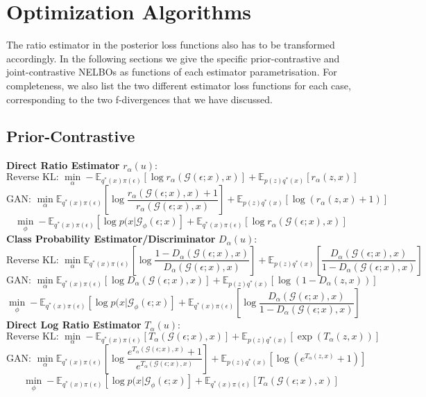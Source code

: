 \documentclass[honours,12pt]{unswthesis}
\newcommand{\E}{\mathbb{E}}
\numberwithin{equation}{section}
\theoremstyle{definition}
\begin{document}
\section{Optimization Algorithms}
The ratio estimator in the posterior loss functions also has to be transformed accordingly. In the following sections we give the specific prior-contrastive and joint-contrastive NELBOs as functions of each estimator parametrisation. For completeness, we also list the two different estimator loss functions for each case, corresponding to the two f-divergences that we have discussed.
\subsection{Prior-Contrastive}
\textbf{Direct Ratio Estimator} $r_\alpha(u)$:
\[\text{Reverse KL: }\min_\alpha -\E_{q^*(x)\pi(\epsilon)}[\log r_\alpha(\mathcal{G}(\epsilon;x),x)]+\E_{p(z)q^*(x)}[r_\alpha(z,x)]\]
\[\text{GAN: }\min_\alpha \E_{q^*(x)\pi(\epsilon)}\left[\log \frac{r_\alpha(\mathcal{G}(\epsilon;x),x)+1}{r_\alpha(\mathcal{G}(\epsilon;x),x)}\right]+\E_{p(z)q^*(x)}[\log(r_\alpha(z,x)+1)]\]
\[\min_\phi-\E_{q^*(x)\pi(\epsilon)}[\log p(x|\mathcal{G}_\phi(\epsilon;x)]+\E_{q^*(x)\pi(\epsilon)}[\log r_\alpha(\mathcal{G}(\epsilon;x),x)]\]
\textbf{Class Probability Estimator/Discriminator} $D_\alpha(u)$:
\[\text{Reverse KL: }\min_\alpha \E_{q^*(x)\pi(\epsilon)}\left[\log \frac{1-D_\alpha(\mathcal{G}(\epsilon;x),x)}{D_\alpha(\mathcal{G}(\epsilon;x),x)}\right]+\E_{p(z)q^*(x)}\left[\frac{D_\alpha(\mathcal{G}(\epsilon;x),x)}{1-D_\alpha(\mathcal{G}(\epsilon;x),x)}\right]\]
\[\text{GAN: }\min_\alpha \E_{q^*(x)\pi(\epsilon)}[\log D_\alpha(\mathcal{G}(\epsilon;x),x)]+\E_{p(z)q^*(x)}[\log(1-D_\alpha(z,x))]\]
\[\min_\phi-\E_{q^*(x)\pi(\epsilon)}[\log p(x|\mathcal{G}_\phi(\epsilon;x)]+\E_{q^*(x)\pi(\epsilon)}\left[\log \frac{D_\alpha(\mathcal{G}(\epsilon;x),x)}{1-D_\alpha(\mathcal{G}(\epsilon;x),x)}\right]\]
\textbf{Direct Log Ratio Estimator} $T_\alpha(u)$:
\[\text{Reverse KL: }\min_\alpha -\E_{q^*(x)\pi(\epsilon)}[T_\alpha(\mathcal{G}(\epsilon;x),x)]+\E_{p(z)q^*(x)}[\exp(T_\alpha(z,x))]\]
\[\text{GAN: }\min_\alpha \E_{q^*(x)\pi(\epsilon)}\left[\log \frac{e^{T_\alpha(\mathcal{G}(\epsilon;x),x)}+1}{e^{T_\alpha(\mathcal{G}(\epsilon;x),x)}}\right]+\E_{p(z)q^*(x)}[\log(e^{T_\alpha(z,x)}+1)]\]
\[\min_\phi-\E_{q^*(x)\pi(\epsilon)}[\log p(x|\mathcal{G}_\phi(\epsilon;x)]+\E_{q^*(x)\pi(\epsilon)}[T_\alpha(\mathcal{G}(\epsilon;x),x)]\]
\end{document}
